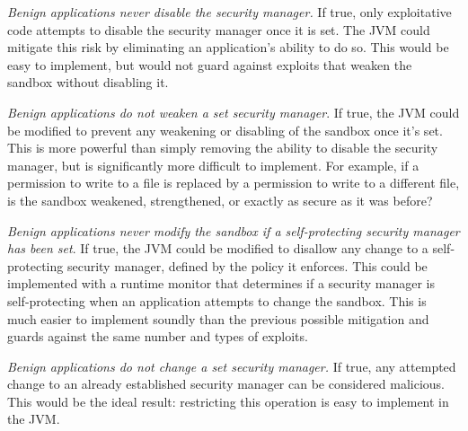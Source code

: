\documentclass{sig-alternate}
\begin{document}
\begin{flushenum}	\setlength{\parskip}{0pt}
  \setlength{\parsep}{0pt}
  \setlength{\itemsep}{0pt}
\item \textit{Benign applications never disable the security manager.}  If true,
  only exploitative code attempts to disable the security manager once it is set.
  The JVM could mitigate this risk by eliminating an application's ability to
  do so.  This would be easy to implement, but would not guard against exploits
  that weaken the sandbox without disabling it.
\item \textit{Benign applications do not weaken a set security manager}.  If
  true, the JVM could be modified to prevent any weakening or disabling of the 
  sandbox once it's set.  This is more powerful than simply removing the
  ability to disable the security manager, but is significantly more difficult to
  implement.
  For example, if a permission to write to a file is
  replaced by a permission to write to a different file, is the sandbox
  weakened, strengthened, or exactly as secure as it was before?
\item \textit{Benign applications never modify the sandbox if a self-protecting
    security manager has been set}. If true, the JVM could be modified to
  disallow any change to a self-protecting security manager, defined by the
  policy it enforces.  This could be implemented with a runtime monitor that
  determines if a security manager is self-protecting when an application
  attempts to change the sandbox. This is much easier to implement soundly than
  the previous possible mitigation and guards against the same number and types of
  exploits.
\item \textit{Benign applications do not change a set security manager.} If
  true, any attempted change to an already established security manager can be
  considered malicious. This would be the ideal result: restricting this
  operation is easy to implement in the JVM.
\end{flushenum}
\end{document}

